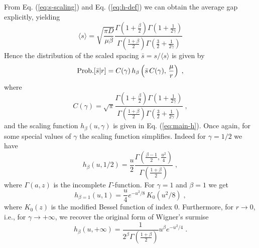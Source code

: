 \documentclass[onecolumn,superscriptaddress,
 amsmath,amssymb,
 aps,
 prd,
]{revtex4-1}
\begin{document}
\vspace*{0.3cm}
From Eq. (\ref{eq:s-scaling}) and Eq. (\ref{eq:h-def}) we can obtain the average gap explicitly, yielding
{
\begin{equation} \label{eq:s-mean}
\langle s \rangle = \sqrt{\frac{\pi D}{\mu \beta}} \frac{\Gamma\left(1 + \frac{\beta}{2}\right)\Gamma\left( 1 + \frac{1}{2\gamma} \right)}{\Gamma\left(\frac{1 + \beta}{2}\right) \Gamma\left( \frac{3}{2} + \frac{1}{2 \gamma} \right)}
\end{equation}
}
Hence the distribution of the scaled spacing $\bar{s} = s / \langle s \rangle$ is given by
\begin{equation} \label{eq:s-mean-C}
{\rm Prob.}[\bar{s}\vert r] = C(\gamma) \, h_\beta\left( \bar{s} \, C(\gamma), \, \frac{\mu}{r} \right) \;,
\end{equation}
where 
\begin{equation}\label{eq:def-Cgamma}
C(\gamma) = \sqrt{\pi} \frac{\Gamma\left(1 + \frac{\beta}{2}\right)\Gamma\left( 1 + \frac{1}{2\gamma} \right)}{\Gamma\left(\frac{1 + \beta}{2}\right) \Gamma\left( \frac{3}{2} + \frac{1}{2 \gamma} \right)} \;,
\end{equation}
and the scaling function $h_\beta(u,\gamma)$ is given in Eq. (\ref{eq:main-h}). Once again, for some special values of $\gamma$ the scaling function simplifies. Indeed for $\gamma = 1/2$ we have
\begin{equation} \label{eq:h-gamma-half}
h_\beta(u, 1/2) = \frac{u}{2} \frac{\Gamma\left(\frac{\beta - 1}{2}, \frac{u^2}{4}\right)}{\Gamma\left( \frac{1 + \beta}{2} \right)} \;,
\end{equation}
where $\Gamma(a, z)$ is the incomplete $\Gamma$-function. For $\gamma = 1$ and $\beta = 1$ we get
\begin{equation} \label{eq:h-gamma-1}
h_{\beta = 1}(u, 1) = \frac{u}{4} e^{-u^2/8} \, K_0(u^2 / 8) \;,
\end{equation}
where $K_0(z)$ is the modified Bessel function of index $0$. Furthermore, for $r \to 0$, i.e., for $\gamma \to +\infty$, we recover the original form of Wigner's surmise
\begin{equation} \label{eq:h-gamma-inf}
h_\beta(u, +\infty) = \frac{1}{2^\beta \Gamma\left( \frac{1 + \beta}{2} \right)} u^\beta e^{- u^2/4} \; .
\end{equation}
\end{document}
